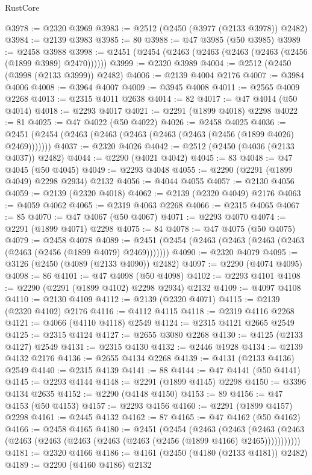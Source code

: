 \begin{lexlean}{RustCore}
\begin{coremodule}
@3978 := @2320 @3969
@3983 := @2512 (@2450 (@3977 (@2133 @3978)) @2482)
@3984 := @2139 @3983
@3985 := 80
@3988 := @47 @3985 (@50 @3985)
@3989 := @2458 @3988
@3998 := @2451 (@2454 (@2463 (@2463 (@2463 (@2463 (@2456 (@1899 @3989) @2470))))))
@3999 := @2320 @3989
@4004 := @2512 (@2450 (@3998 (@2133 @3999)) @2482)
@4006 := @2139 @4004 @2176
@4007 := @3984 @4006
@4008 := @3964 @4007
@4009 := @3945 @4008
@4011 := @2565 @4009 @2268
@4013 := @2315 @4011 @2638
@4014 := 82
@4017 := @47 @4014 (@50 @4014)
@4018 := @2293 @4017
@4021 := @2291 (@1899 @4018) @2298
@4022 := 81
@4025 := @47 @4022 (@50 @4022)
@4026 := @2458 @4025
@4036 := @2451 (@2454 (@2463 (@2463 (@2463 (@2463 (@2463 (@2456 (@1899 @4026) @2469)))))))
@4037 := @2320 @4026
@4042 := @2512 (@2450 (@4036 (@2133 @4037)) @2482)
@4044 := @2290 (@4021 @4042)
@4045 := 83
@4048 := @47 @4045 (@50 @4045)
@4049 := @2293 @4048
@4055 := @2290 (@2291 (@1899 @4049) @2298 @2934) @2132
@4056 := @4044 @4055
@4057 := @2130 @4056
@4059 := @2139 (@2320 @4018)
@4062 := @2139 (@2320 @4049) @2176
@4063 := @4059 @4062
@4065 := @2319 @4063 @2268
@4066 := @2315 @4065
@4067 := 85
@4070 := @47 @4067 (@50 @4067)
@4071 := @2293 @4070
@4074 := @2291 (@1899 @4071) @2298
@4075 := 84
@4078 := @47 @4075 (@50 @4075)
@4079 := @2458 @4078
@4089 := @2451 (@2454 (@2463 (@2463 (@2463 (@2463 (@2463 (@2456 (@1899 @4079) @2469)))))))
@4090 := @2320 @4079
@4095 := @3126 (@2450 (@4089 (@2133 @4090)) @2482)
@4097 := @2290 (@4074 @4095)
@4098 := 86
@4101 := @47 @4098 (@50 @4098)
@4102 := @2293 @4101
@4108 := @2290 (@2291 (@1899 @4102) @2298 @2934) @2132
@4109 := @4097 @4108
@4110 := @2130 @4109
@4112 := @2139 (@2320 @4071)
@4115 := @2139 (@2320 @4102) @2176
@4116 := @4112 @4115
@4118 := @2319 @4116 @2268
@4121 := @4066 (@4110 @4118) @2549
@4124 := @2315 @4121 @2665 @2549
@4125 := @2315 @4124
@4127 := @2655 @3080 @2268
@4130 := @4125 (@2133 @4127) @2549
@4131 := @2315 @4130
@4132 := @2446 @1928
@4134 := @2139 @4132 @2176
@4136 := @2655 @4134 @2268
@4139 := @4131 (@2133 @4136) @2549
@4140 := @2315 @4139
@4141 := 88
@4144 := @47 @4141 (@50 @4141)
@4145 := @2293 @4144
@4148 := @2291 (@1899 @4145) @2298
@4150 := @3396 @4134 @2635
@4152 := @2290 (@4148 @4150)
@4153 := 89
@4156 := @47 @4153 (@50 @4153)
@4157 := @2293 @4156
@4160 := @2291 (@1899 @4157) @2298
@4161 := @2445 @4132
@4162 := 87
@4165 := @47 @4162 (@50 @4162)
@4166 := @2458 @4165
@4180 := @2451
    (@2454
      (@2463
        (@2463
          (@2463 (@2463 (@2463 (@2463 (@2463 (@2463 (@2463 (@2456 (@1899 @4166) @2465)))))))))))
@4181 := @2320 @4166
@4186 := @4161 (@2450 (@4180 (@2133 @4181)) @2482)
@4189 := @2290 (@4160 @4186) @2132

\end{coremodule}
\end{lexlean}
